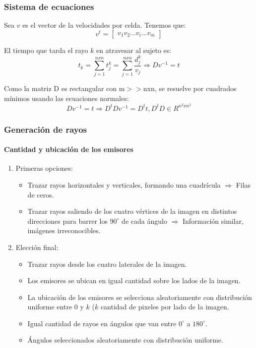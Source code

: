 \documentclass[11pt]{beamer}
\begin{document}
\begin{frame}
\frametitle{Sistema de ecuaciones}
\par Sea $v$ es el vector de la velocidades por celda. Tenemos que:
$$
v^t=\left[
\begin{array}{c}
v_1 
v_2 
... 
v_i 
... 
v_{m} 
\end{array}
\right]
$$
\par El tiempo que tarda el rayo $k$ en atravesar al sujeto es:
$$t_{k}=\sum_{j=1}^{nxn}t^k_{j} = \sum_{j=1}^{nxn} \dfrac{d^k_j}{v_{j}} \Rightarrow Dv^{-1}=t
$$
\par Como la matriz D es rectangular con m$>>$nxn, se resuelve por cuadrados mínimos usando las ecuaciones normales:
$$
Dv^{-1}=t \Rightarrow D^tDv^{-1}=D^tt, D^tD \in R^{n^2 x n^2}
$$
\end{frame}


\begin{frame}
\frametitle{Generación de rayos}
\framesubtitle{Cantidad y ubicación de los emisores}

\begin{enumerate}
    \item Primeras opciones:
    \begin{itemize}
        \item Trazar rayos horizontales y verticales, formando una cuadrícula $\Rightarrow$ Filas de ceros.
        \item Trazar rayos saliendo de los cuatro vértices de la imagen en distintos direcciones para barrer los $90^{\circ}$ de cada ángulo $\Rightarrow$ Información similar, imágenes irreconocibles.
    \end{itemize}
    \item Elección final:
    \begin{itemize}
        
    \item Trazar rayos desde los cuatro laterales de la imagen.
    \item Los emisores se ubican en igual cantidad sobre los lados de la imagen.
    \item La ubicación de los emisores se selecciona aleatoriamente con distribución uniforme entre $0$ y $k$ ($k$ cantidad de pixeles por lado de la imagen.
    \item Igual cantidad de rayos en ángulos que van entre $0^{\circ}$ a $180^{\circ}$.
    \item Ángulos seleccionados aleatoriamente con distribución uniforme.
    \end{itemize}

\end{enumerate}

\end{frame}
\end{document}
